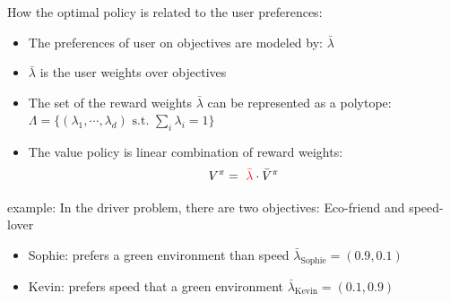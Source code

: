 \documentclass{beamer}
\newcommand\Fontvi{\fontsize{9}{10.2}\selectfont}
\begin{document}
\begin{frame}{How the optimal policy is related to the user preferences:}
\Fontvi
\begin{itemize}
\item The preferences of user on objectives are modeled by: {\color{red}$\bar{\lambda}$} 
\item {\color{red}$\bar{\lambda}$} is the user weights over objectives
\item The set of the reward weights {\color{red}$\bar{\lambda}$} can be represented as a polytope: $\Lambda = \{ (\lambda_1, \cdots, \lambda_d) \text{ s.t. } \sum_i \lambda_i = 1\}$
\item The value policy is linear combination of reward weights:
\begin{equation*}
V^{\pi} = \text{ {\color{red}$\bar{\lambda}$}} \cdot \bar{V}^{\pi} %
\end{equation*}
\end{itemize}


\alert{example}: In the driver problem, there are two objectives: {\color{mygreen} Eco-friend} and  {\color{blue} speed-lover}
\begin{itemize}
\item[] {\color{mygreen} Sophie}: prefers a green environment than speed $\bar{\lambda}_{\text{Sophie}} = (0.9, 0.1)$
\item[] {\color{blue} Kevin}: prefers speed that a green environment  $\bar{\lambda}_{\text{Kevin}} = (0.1, 0.9)$
\end{itemize}


\end{frame}
\end{document}
